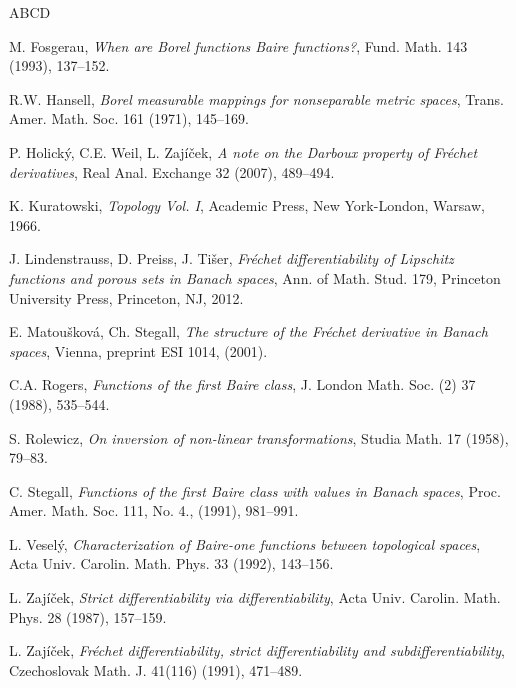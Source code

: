 \documentclass[12pt,a4paper]{amsart}
\theoremstyle{plain}
\theoremstyle{definition}
\theoremstyle{remark}
\numberwithin{equation}{section}
\begin{document}
  

\begin{thebibliography}{ABCD}



M. Fosgerau, 
{\em When are Borel functions Baire functions?},
Fund. Math. 143 (1993),  137--152.

R.W. Hansell, 
{\em Borel measurable mappings for nonseparable metric spaces},
Trans. Amer. Math. Soc. 161 (1971), 145--169.

P. Holický, C.E. Weil, L. Zajíček, 
{\em A note on the Darboux property of Fréchet derivatives},
Real Anal. Exchange 32 (2007),  489--494.


K. Kuratowski, 
{\em Topology Vol. I},
Academic Press, New York-London, Warsaw, 1966.

J. Lindenstrauss, D. Preiss,  J. Tišer,
{\em Fréchet differentiability of Lipschitz functions and porous sets in Banach spaces},
Ann. of Math. Stud. 179,
Princeton University Press, Princeton, NJ, 2012. 


E. Matoušková, Ch. Stegall, {\em The structure of the Fréchet derivative in Banach spaces},
 Vienna, preprint ESI 1014, (2001).

C.A. Rogers, 
{\em Functions of the first Baire class},
J. London Math. Soc. (2) 37 (1988),  535--544.

S. Rolewicz, 
{\em On inversion of non-linear transformations},
Studia Math. 17 (1958), 79--83.



 C. Stegall, {\em  Functions of the first Baire class with values in Banach spaces},
Proc. Amer. Math. Soc. 111, No. 4.,  (1991), 981--991.

L. Veselý, 
{\em Characterization of Baire-one functions between topological spaces},
Acta Univ. Carolin. Math. Phys. 33 (1992),  143--156.

 
L. Zajíček, 
{\em Strict differentiability via differentiability},
Acta Univ. Carolin. Math. Phys. 28 (1987),  157--159.



 L. Zajíček, 
{\em Fréchet differentiability, strict differentiability and subdifferentiability},
Czechoslovak Math. J. 41(116) (1991),  471--489.


\end{thebibliography}
\end{document}
